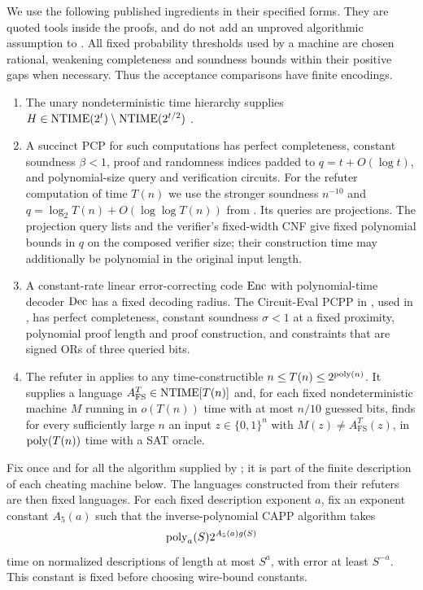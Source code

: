 We use the following published ingredients in their specified forms.
They are quoted tools inside the proofs, and do not add an unproved
algorithmic assumption to \HTC.
All fixed probability thresholds used by a machine are chosen rational,
weakening completeness and soundness bounds within their positive gaps
when necessary. Thus the acceptance comparisons have finite encodings.
\begin{enumerate}
\item The unary nondeterministic time hierarchy supplies
$H\in\mathrm{NTIME}(2^t)\setminus\mathrm{NTIME}(2^{t/2})$
\cite[Theorem 2.1 (full version)]{Williams13}.
\item A succinct PCP for such computations has perfect completeness,
constant soundness $\beta<1$, proof and randomness indices padded to
$q=t+O(\log t)$, and polynomial-size query and verification circuits.
For the refuter computation of time $T(n)$ we use the stronger
soundness $n^{-10}$ and $q=\log_2T(n)+O(\log\log T(n))$ from
\cite[Lemma 3.10]{CLW20}. Its queries are projections. The projection
query lists and the verifier's fixed-width CNF give fixed polynomial
bounds in $q$ on the composed verifier size; their construction time
may additionally be polynomial in the original input length.
\item A constant-rate linear error-correcting code $\operatorname{Enc}$ with
polynomial-time decoder $\operatorname{Dec}$ has a fixed decoding radius. The
Circuit-Eval PCPP in \cite[Lemma 24]{CW19}, used in
\cite[Lemma 3.6]{BW24}, has perfect completeness, constant soundness
$\sigma<1$ at a fixed proximity, polynomial proof length and proof
construction, and constraints that are signed ORs of three queried
bits.
\item The refuter in \cite[Theorem 4.6]{CLW20} applies to any
time-constructible $n\le T(n)\le2^{\operatorname{poly}(n)}$. It supplies a language
$A^T_{\mathrm{FS}}\in\mathrm{NTIME}[T(n)]$ and, for each fixed
nondeterministic machine $M$ running in $o(T(n))$ time with at most
$n/10$ guessed bits, finds for every sufficiently large $n$ an input
$z\in\{0,1\}^n$ with $M(z)\ne A^T_{\mathrm{FS}}(z)$, in
$\operatorname{poly}(T(n))$ time with a SAT oracle.
\end{enumerate}

Fix once and for all the algorithm supplied by \HTC; it is part of
the finite description of each cheating machine below. The languages
constructed from their refuters are then fixed languages.
For each fixed description exponent $a$, fix an exponent constant
$A_5(a)$ such that the inverse-polynomial CAPP algorithm takes
\[
 \operatorname{poly}_a(S)2^{A_5(a)g(S)}
\]
time on normalized descriptions of length at most $S^a$, with error
at least $S^{-a}$. This constant is fixed before choosing wire-bound
constants.

